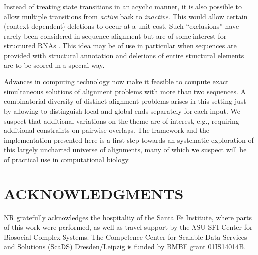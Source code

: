 \documentclass[a4paper,10pt]{article}
\let\cite\citep
\begin{document}
Instead of treating state transitions in an acyclic manner, it is also
possible to allow multiple transitions from \textit{active} back to
\textit{inactive}. This would allow certain (context dependent) deletions
to occur at a unit cost. Such ``exclusions'' have rarely been considered in
sequence alignment but are of some interest for structured RNAs
\cite{Schirmer:13}. This idea may be of use in particular when sequences
are provided with structural annotation and deletions of entire structural
elements are to be scored in a special way.

Advances in computing technology now make it feasible to compute exact
  simultaneous solutions of alignment problems with more than two
  sequences. A combinatorial diversity of distinct alignment problems
  arises in this setting just by allowing to distinguish local and global
  ends separately for each input. We suspect that additional variations on
  the theme are of interest, e.g., requiring additional constraints on
  pairwise overlaps. The framework and the implementation presented here is
  a first step towards an systematic exploration of this largely uncharted
  universe of alignments, many of which we suspect will be of practical use
  in computational biology.

\section*{\uppercase{Acknowledgments}}

NR gratefully acknowledges the hospitality of the Santa Fe Institute, where
parts of this work were performed, as well as travel support by the ASU-SFI
Center for Biosocial Complex Systems. The Competence Center for Scalable
Data Services and Solutions (ScaDS) Dresden/Leipzig is funded by BMBF grant
01IS14014B.


{\small
}

\vfill
\end{document}
